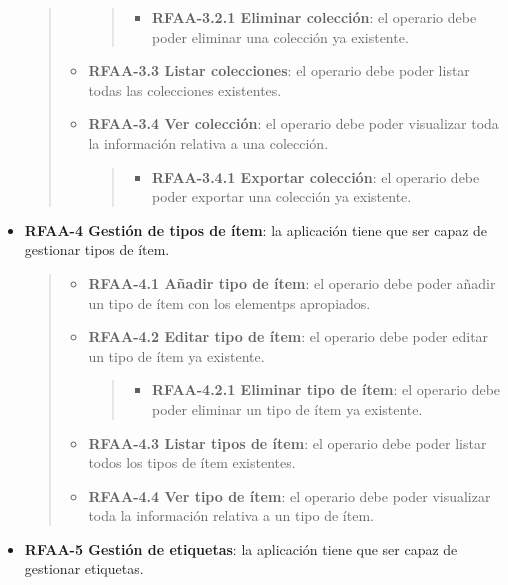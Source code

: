 \documentclass[
]{article}
\providecommand{\tightlist}{%
  \setlength{\itemsep}{0pt}\setlength{\parskip}{0pt}}
\begin{document}
\begin{itemize}
\begin{quote}
\begin{itemize}
    \begin{quote}
    \begin{itemize}
    \tightlist
    \item
      \textbf{RFAA-3.2.1 Eliminar colección}: el operario debe poder
      eliminar una colección ya existente.
    \end{itemize}
    \end{quote}
  \item
    \textbf{RFAA-3.3 Listar colecciones}: el operario debe poder listar
    todas las colecciones existentes.
  \item
    \textbf{RFAA-3.4 Ver colección}: el operario debe poder visualizar
    toda la información relativa a una colección.

    \begin{quote}
    \begin{itemize}
    \tightlist
    \item
      \textbf{RFAA-3.4.1 Exportar colección}: el operario debe poder
      exportar una colección ya existente.
    \end{itemize}
    \end{quote}
  \end{itemize}
  \end{quote}
\item
  \textbf{RFAA-4 Gestión de tipos de ítem}: la aplicación tiene que ser
  capaz de gestionar tipos de ítem.

  \begin{quote}
  \begin{itemize}
  \item
    \textbf{RFAA-4.1 Añadir tipo de ítem}: el operario debe poder añadir
    un tipo de ítem con los elementps apropiados.
  \item
    \textbf{RFAA-4.2 Editar tipo de ítem}: el operario debe poder editar
    un tipo de ítem ya existente.

    \begin{quote}
    \begin{itemize}
    \tightlist
    \item
      \textbf{RFAA-4.2.1 Eliminar tipo de ítem}: el operario debe poder
      eliminar un tipo de ítem ya existente.
    \end{itemize}
    \end{quote}
  \item
    \textbf{RFAA-4.3 Listar tipos de ítem}: el operario debe poder
    listar todos los tipos de ítem existentes.
  \item
    \textbf{RFAA-4.4 Ver tipo de ítem}: el operario debe poder
    visualizar toda la información relativa a un tipo de ítem.
  \end{itemize}
  \end{quote}
\item
  \textbf{RFAA-5 Gestión de etiquetas}: la aplicación tiene que ser
  capaz de gestionar etiquetas.


\end{itemize}
\end{document}
